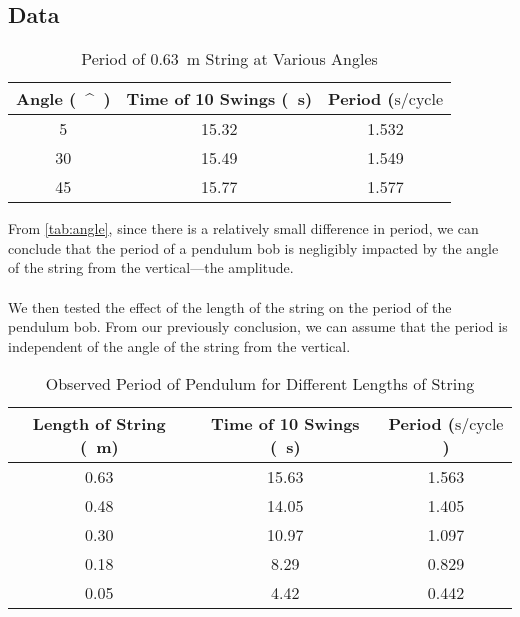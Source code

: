\documentclass[article, 12pt]{article}
\newcommand{\degree}{^\circ}
\begin{document}
    \subsection{Data}
    \begin{table}[H]
        \centering
        \begin{tabular}{|c|c|c|}
            \hline
            \textbf{Angle (\SI{}{\degree})} & \textbf{Time of 10 Swings (\SI{}{\second})} & \textbf{Period} ($\text{s}/\text{cycle}$ \\
            \hline
            5  & 15.32 & 1.532 \\
            30 & 15.49 & 1.549 \\
            45 & 15.77 & 1.577 \\
            \hline
        \end{tabular}
        \caption{Period of \SI{0.63}{\meter} String at Various Angles}
        \label{tab:angle}
    \end{table}
    From \autoref{tab:angle}, since there is a relatively small difference in period, we can conclude that the period of a pendulum bob is negligibly impacted by the angle of the string from the vertical---the amplitude. \\
    \\
    We then tested the effect of the length of the string on the period of the pendulum bob. From our previously conclusion, we can assume that the period is independent of the angle of the string from the vertical. \\
    \begin{table}[H]
        \centering
        \begin{tabular}{|c|c|c|}
            \hline
            \textbf{Length of String} (\SI{}{\meter}) & \textbf{Time of 10 Swings} (\SI{}{\second}) & \textbf{Period} ($\text{s}/\text{cycle}$) \\
            \hline
            0.63 & 15.63 & 1.563 \\
            0.48 & 14.05 & 1.405 \\
            0.30 & 10.97 & 1.097 \\
            0.18 & 8.29  & 0.829 \\
            0.05 & 4.42  & 0.442 \\ 
            \hline
        \end{tabular}
        \caption{Observed Period of Pendulum for Different Lengths of String}
        \label{tab:observedPeriod}
    \end{table}
\end{document}
